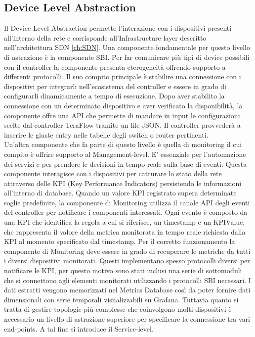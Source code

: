 \subsection{Device Level Abstraction}
Il Device Level Abstraction permette l'interazione con i dispositivi presenti all'interno della rete e corrisponde all'Infrastructure layer descritto nell'architettura SDN \ref{ch:SDN}.
Una componente fondamentale per questo livello di astrazione è la componente SBI.
Per far comunicare più tipi di device possibili con il controller la componente presenta eterogeneità offrendo supporto a differenti protocolli.
Il suo compito principale è stabilire una connessione con i dispositivi per integrarli nell'ecosistema del controller
e essere in grado di configurarli dinamicamente a tempo di esecuzione. 
Dopo aver stabilito la connessione con un determinato dispositivo e aver verificato la disponibilità,
la componente offre una API che permette di mandare in input le configurazioni scelte dal controller TeraFlow tramite un file JSON. 
Il controller provvederà a inserire le giuste entry nelle tabelle degli switch o router pertinenti.
\\Un'altra componente che fa parte di questo livello è quella di monitoring il cui compito è offrire supporto al Management-level.
E' essenziale per l'automazione dei servizi e per prendere le decisioni in tempo reale sulla base di eventi.
Questa componente interagisce con i dispositivi per catturare lo stato della rete attraverso delle KPI (Key Performance Indicators) persistendo le informazioni all'interno di database. %
Quando un valore KPI registrato supera determinate soglie predefinite, la componente di Monitoring utilizza il canale API degli eventi del controller per notificare i componenti interessati.
Ogni evento è composto da una KPI che identifica la regola a cui si riferisce, un timestamp e un KPIValue, che rappresenta il valore della metrica monitorata in tempo reale richiesta dalla KPI al momento specificato dal timestamp.
Per il corretto funzionamento la componente di Monitoring deve essere in grado di recuperare le metriche da tutti i diversi dispositivi monitorati.
Questi implementano spesso protocolli diversi per notificare le KPI, per questo motivo sono stati inclusi una serie di sottomoduli che si connettono 
agli elementi monitorati utilizzando i protocolli SBI necessari. I dati estratti vengono memorizzati nel Metrics Database così da poter fornire dati dimensionali 
con serie temporali visualizzabili su Grafana.
Tuttavia quanto si tratta di gestire topologie più complesse che coinvolgono molti dispositivi è necessario un livello di astrazione superiore per specificare la connessione tra vari end-points. A tal fine si introduce il Service-level. 

